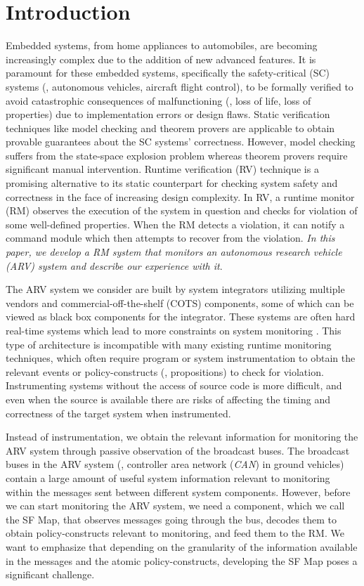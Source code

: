 \section{Introduction}
Embedded systems, from home appliances to automobiles, are becoming increasingly complex due to the addition of new advanced features. 
It is paramount for these embedded systems, specifically the safety-critical (SC) systems (\eg, autonomous vehicles, aircraft flight control),  
to be formally verified to avoid catastrophic consequences  of malfunctioning (\eg, loss of life, loss of properties) due to implementation errors or 
design flaws. Static verification techniques like model checking and theorem provers are applicable to obtain provable guarantees about the SC systems' 
correctness. However, model checking suffers from the state-space explosion problem whereas theorem provers require significant manual intervention.  
Runtime verification (RV) technique is a promising alternative to its static counterpart for checking system safety and correctness in the face of 
increasing design complexity. 
In RV,  a runtime monitor (RM) observes the execution of the system in question and checks for violation of some well-defined properties. 
When the RM detects a violation, it can notify a command module which then attempts to recover from the violation. \emph{In this paper, we develop a 
RM system that monitors an autonomous research vehicle (ARV) system and describe our experience with it}.

The ARV system we consider are built by system integrators 
utilizing multiple vendors and commercial-off-the-shelf (COTS) components, some of which can be 
viewed as black box components for the integrator. 
These systems are often  hard real-time systems which lead to more constraints on 
system monitoring \cite{Goodloe2010}. This type of architecture is incompatible with many 
existing runtime monitoring techniques, which often require program or system instrumentation \cite{} to obtain 
the relevant events or policy-constructs (\eg, propositions) to check for violation. 
Instrumenting systems without the access of source code  is more difficult, 
and even when the source  is available there are risks of affecting the timing and 
correctness of the target system when instrumented.

Instead of instrumentation, we obtain the relevant information for monitoring the ARV system through passive observation 
of the broadcast buses. The broadcast buses in the ARV system (\eg, controller area network (\textit{CAN}) in ground vehicles) 
 contain a large amount of useful system information relevant to monitoring 
within the messages sent between different system components. However, before we can start 
monitoring the ARV system, we need a component, which we call the \textsf{SF Map}, that 
observes messages going through the bus, decodes them to obtain policy-constructs 
relevant to monitoring, and feed them to the RM. We want to emphasize that depending on the granularity 
of the information available in the messages and the atomic policy-constructs, developing the \textsf{SF Map} 
poses a significant challenge. 

